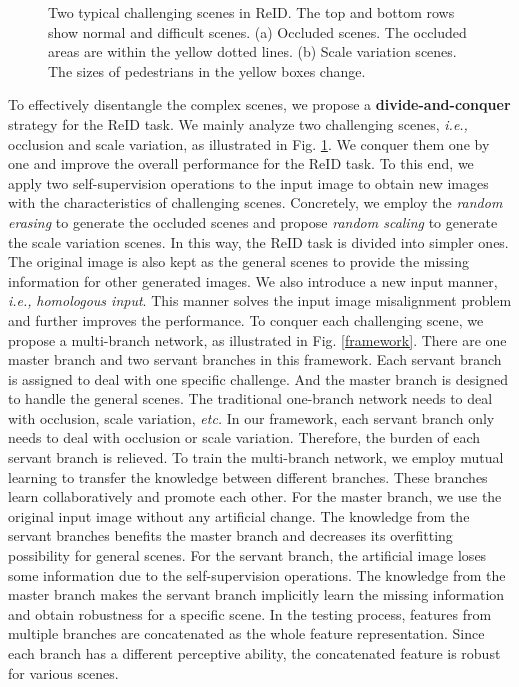 \documentclass[a4paper]{cas-dc}
\begin{document}
\begin{figure}[t]
	\centering
	\caption{Two typical challenging scenes in ReID. The top and bottom rows show normal and difficult scenes. (a) Occluded scenes. The occluded areas are within the yellow dotted lines. (b) Scale variation scenes. The sizes of pedestrians in the yellow boxes change.} \label{motivation}
\end{figure}

To effectively disentangle the complex scenes, we propose a \textbf{divide-and-conquer} strategy for the ReID task. We mainly analyze two challenging scenes, \textit{i.e.,} occlusion and scale variation, as illustrated in Fig. \ref{motivation}. We conquer them one by one and improve the overall performance for the ReID task. To this end, we apply two self-supervision operations to the input image to obtain new images with the characteristics of challenging scenes. Concretely, we employ the \textit{random erasing} to generate the occluded scenes and propose \textit{random scaling} to generate the scale variation scenes. In this way, the ReID task is divided into simpler ones. The original image is also kept as the general scenes to provide the missing information for other generated images. We also introduce a new input manner, \textit{i.e.,} \textit{homologous input}. This manner solves the input image misalignment problem and further improves the performance. To conquer each challenging scene, we propose a multi-branch network, as illustrated in Fig. \ref{framework}. There are one master branch and two servant branches in this framework. Each servant branch is assigned to deal with one specific challenge. And the master branch is designed to handle the general scenes. The traditional one-branch network needs to deal with occlusion, scale variation, \textit{etc.} In our framework, each servant branch only needs to deal with occlusion or scale variation. Therefore, the burden of each servant branch is relieved. To train the multi-branch network, we employ mutual learning to transfer the knowledge between different branches. These branches learn collaboratively and promote each other. For the master branch, we use the original input image without any artificial change. The knowledge from the servant branches benefits the master branch and decreases its overfitting possibility for general scenes. For the servant branch, the artificial image loses some information due to the self-supervision operations. The knowledge from the master branch makes the servant branch implicitly learn the missing information and obtain robustness for a specific scene. In the testing process, features from multiple branches are concatenated as the whole feature representation. Since each branch has a different perceptive ability, the concatenated feature is robust for various scenes.
\end{document}
